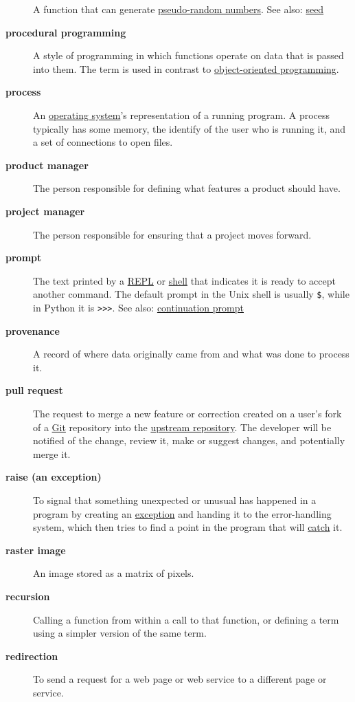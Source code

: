 \documentclass[
]{krantz}
\begin{document}
\begin{description}
A function that can generate \protect\hyperlink{pseudo_random_number}{pseudo-random numbers}. See also: \protect\hyperlink{seed}{seed}
\item[\textbf{procedural programming}]
A style of programming in which functions operate on data that is passed into them. The term is used in contrast to \protect\hyperlink{oop}{object-oriented programming}.
\item[\textbf{process}]
An \protect\hyperlink{operating_system}{operating system}'s representation of a running program. A process typically has some memory, the identify of the user who is running it, and a set of connections to open files.
\item[\textbf{product manager}]
The person responsible for defining what features a product should have.
\item[\textbf{project manager}]
The person responsible for ensuring that a project moves forward.
\item[\textbf{prompt}]
The text printed by a \protect\hyperlink{repl}{REPL} or \protect\hyperlink{shell}{shell} that indicates it is ready to accept another command. The default prompt in the Unix shell is usually \texttt{\$}, while in Python it is \texttt{\textgreater{}\textgreater{}\textgreater{}}. See also: \protect\hyperlink{continuation_prompt}{continuation prompt}
\item[\textbf{provenance}]
A record of where data originally came from and what was done to process it.
\item[\textbf{pull request}]
The request to merge a new feature or correction created on a user's fork of a \protect\hyperlink{git}{Git} repository into the \protect\hyperlink{upstream_repository}{upstream repository}. The developer will be notified of the change, review it, make or suggest changes, and potentially merge it.
\item[\textbf{raise (an exception)}]
To signal that something unexpected or unusual has happened in a program by creating an \protect\hyperlink{exception}{exception} and handing it to the error-handling system, which then tries to find a point in the program that will \protect\hyperlink{catch_exception}{catch} it.
\item[\textbf{raster image}]
An image stored as a matrix of pixels.
\item[\textbf{recursion}]
Calling a function from within a call to that function, or defining a term using a simpler version of the same term.
\item[\textbf{redirection}]
To send a request for a web page or web service to a different page or service.

\end{description}
\end{document}
